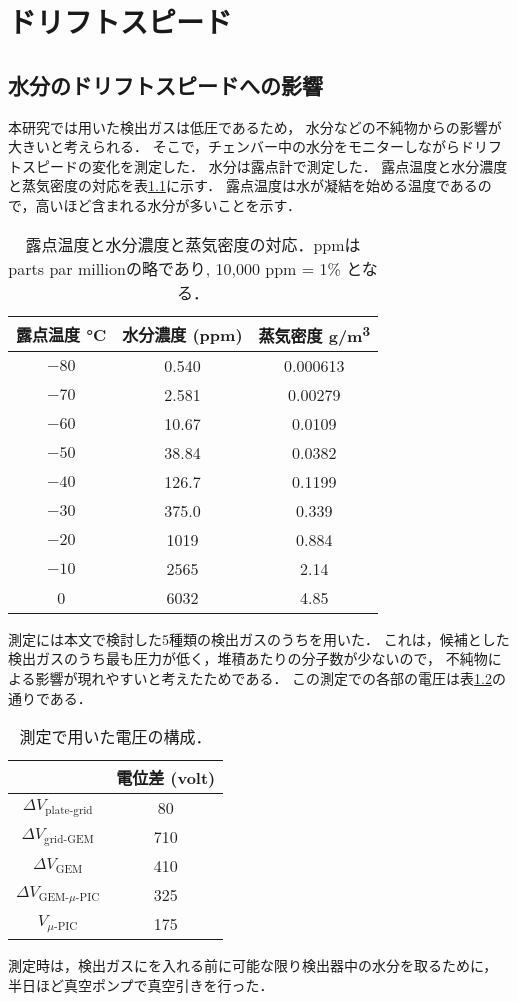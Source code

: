 \documentclass[../master]{subfiles}
\begin{document}
\chapter{ドリフトスピード}
\section{水分のドリフトスピードへの影響}
本研究では用いた検出ガスは低圧であるため，
水分などの不純物からの影響が大きいと考えられる．
そこで，チェンバー中の水分をモニターしながらドリフトスピードの変化を測定した．
水分は露点計で測定した．
露点温度と水分濃度と蒸気密度の対応を表\ref{tab::dew_point_humidity}に示す．
露点温度は水が凝結を始める温度であるので，高いほど含まれる水分が多いことを示す．
\begin{table}
  \centering
  \caption{露点温度と水分濃度と蒸気密度の対応．ppmはparts par millionの略であり, 10,000 ppm = 1\% となる．}
  \label{tab::dew_point_humidity}
  \begin{tabular}{ccc}
    \toprule
    露点温度 \si{\degreeCelsius} & 水分濃度 (ppm) & 蒸気密度 \si{\gram/\cubic\metre} \\
    \midrule
    $-80$ & 0.540 & 0.000613 \\
    $-70$ & 2.581 & 0.00279 \\
    $-60$ & 10.67 & 0.0109 \\
    $-50$ & 38.84 & 0.0382 \\
    $-40$ & 126.7 & 0.1199 \\
    $-30$ & 375.0 & 0.339 \\
    $-20$ & 1019 & 0.884 \\
    $-10$ & 2565 & 2.14 \\
    0     & 6032 & 4.85 \\
    \bottomrule
  \end{tabular}
\end{table}
測定には本文で検討した5種類の検出ガスのうち\Methane を用いた．
これは，候補とした検出ガスのうち最も圧力が低く，堆積あたりの分子数が少ないので，
不純物による影響が現れやすいと考えたためである．
この測定での各部の電圧は表\ref{tab::configuration_for_drift_dep}の通りである．
\begin{table}
  \centering
  \caption{測定で用いた電圧の構成．}
  \label{tab::configuration_for_drift_dep}
  \begin{tabular}{cc}
    \toprule
    & 電位差 (\si{volt}) \\
    \midrule
    $\Delta V_{\text{plate-grid}}$ & 80 \\
    $\Delta V_{\text{grid-GEM}}$ & 710 \\
    $\Delta V_{\text{GEM}}$ & 410 \\
    $\Delta V_{\text{GEM-}\mu\text{-PIC}}$ & 325 \\
    $V_{\mu\text{-PIC}}$ & 175 \\
    \bottomrule
  \end{tabular}
\end{table}
測定時は，検出ガスにを入れる前に可能な限り検出器中の水分を取るために，
半日ほど真空ポンプで真空引きを行った．
\end{document}
